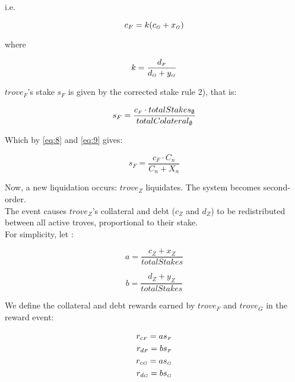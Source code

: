 \documentclass[reqno]{article}
\begin{document}
\bigskip
i.e.

\begin{equation} \label{eq:14}
    c_F=k(c_\mathsmaller{G}+x_\mathsmaller{G})
\end{equation}

\bigskip
where

\begin{equation} \label{eq:15}
    k=\frac{d_\mathsmaller{F}}{d_\mathsmaller{G}+y_\mathsmaller{G}}
\end{equation}


\bigskip
$trove_F$’s stake $s_F$ is given by the corrected stake rule 2), that is:

\begin{equation} 
    s_F=\frac{c_\mathsmaller{F} \cdot totalStakes_\emptyset}{totalColateral_\emptyset}
\end{equation}

\bigskip
Which by \ref{eq:8} and \ref{eq:9} gives:

\begin{equation} \label{eq:17}
    s_F=\frac{c_F \cdot C_n}{C_n+X_n}
\end{equation}

\bigskip
Now, a new liquidation occurs: $trove_Z$ liquidates. The system becomes second-order.\\

The event causes $trove_Z$’s collateral and debt ($c_Z$ and $d_Z$) to be redistributed between all active troves, proportional to their stake.\\

For simplicity, let :

\begin{equation} 
    a=\frac{c_Z+x_Z}{totalStakes}
\end{equation}

\begin{equation} 
    b=\frac{d_Z+y_Z}{totalStakes}
\end{equation}

\bigskip
We define the collateral and debt rewards earned by $trove_F$ and $trove_G$ in the reward event:

\begin{equation} \label{eq:20}
    \begin{split}
        r_{c\mathsmaller{F}}=as_\mathsmaller{F}\\
        r_{d\mathsmaller{F}}=bs_\mathsmaller{F}\\
        r_{c\mathsmaller{G}}=as_\mathsmaller{G}\\
        r_{d\mathsmaller{G}}=bs_\mathsmaller{G}
    \end{split}
\end{equation}
\end{document}
